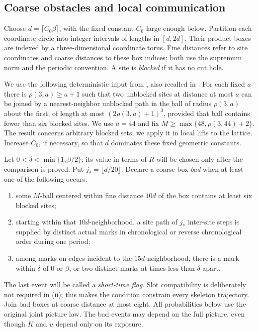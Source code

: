 \subsection{Coarse obstacles and local communication}

Choose $d=\lceil C_0\beta\rceil$, with the fixed constant $C_0$
large enough below.  Partition each coordinate circle into integer
intervals of lengths in $[d,2d]$.  Their product boxes are indexed
by a three-dimensional coordinate torus.  Fine distances refer to
site coordinates and coarse distances to these box indices; both
use the supremum norm and the periodic convention.  A site is
\emph{blocked} if it has no cut hole.

We use the following deterministic input from
\cite[Lemma~5.5]{Ord}, also recalled in \cite[Section~3]{BL}.
For each fixed $a$ there is $\rho(3,a)\ge a+1$ such that two
unblocked sites at distance at most $a$ can be joined by a
nearest-neighbor unblocked path in the ball of radius $\rho(3,a)$
about the first, of length at most $(2\rho(3,a)+1)^3$, provided
that ball contains fewer than six blocked sites.  We use $a=44$
and fix $M\ge\max\{48,\rho(3,44)+2\}$.  The result concerns
arbitrary blocked sets; we apply it in local lifts to the lattice.
Increase $C_0$, if necessary, so that $d$ dominates these fixed
geometric constants.

Let $0<\delta<\min\{1,\beta/2\}$; its value in terms of $R$
will be chosen only after the comparison is proved.  Put
$j_* =\lfloor d/20\rfloor$.  Declare a coarse box \emph{bad}
when at least one of the following occurs:
\begin{enumerate}[label=(\roman*)]
 \item some $M$-ball centered within fine distance $10d$ of the
 box contains at least six blocked sites;
 \item starting within that $10d$-neighborhood, a site path of
 $j_*$ inter-site steps is supplied by distinct actual marks in
 chronological or reverse chronological order during one period;
 \item among marks on edges incident to the $15d$-neighborhood,
 there is a mark within $\delta$ of $0$ or $\beta$, or two distinct
 marks at times less than $\delta$ apart.
\end{enumerate}
The last event will be called a \emph{short-time flag}.  Slot
compatibility is deliberately not required in (ii); this makes the
condition constrain every skeleton trajectory.  Join bad boxes
at coarse distance at most eight.  All probabilities below use the
original joint picture law.  The bad events may depend on the full
picture, even though $K$ and $u$ depend only on its exposure.

